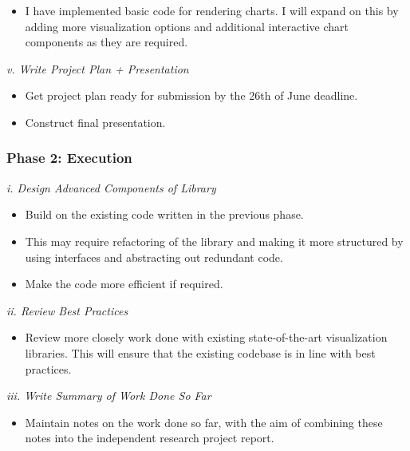 \documentclass[12pt]{article}
\begin{document}
	\begin{itemize}
		
		\item I have implemented basic code for rendering charts. I will expand on this by adding more visualization options and additional interactive chart components as they are required.
		
	\end{itemize}
	
	\textit{v. Write Project Plan + Presentation}
	
	\begin{itemize}
		\item Get project plan ready for submission by the 26th of June deadline.
		\item Construct final presentation.
	\end{itemize}
	
	\subsubsection{Phase 2: Execution}
	
	\textit{i. Design Advanced Components of Library}
	
	
	\begin{itemize}
		
		\item Build on the existing code written in the previous phase. 
		\item This may require refactoring of the library and making it more structured by using interfaces and abstracting out redundant code.
		\item Make the code more efficient if required.
		
	\end{itemize}
	
	\textit{ii. Review Best Practices}
	
	\begin{itemize}
		\item Review more closely work done with existing state-of-the-art visualization libraries. This will ensure that the existing codebase is in line with best practices.
	\end{itemize}
	
	\textit{iii. Write Summary of Work Done So Far}
	
	\begin{itemize}
		\item Maintain notes on the work done so far, with the aim of combining these notes into the independent research project report.
	\end{itemize}
	
\end{document}
